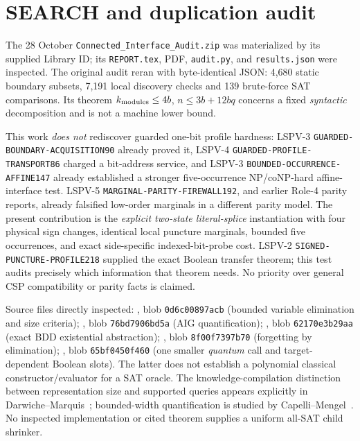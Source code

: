 \documentclass[11pt]{article}
\begin{document}
\section{SEARCH and duplication audit}
The 28 October \texttt{Connected\_Interface\_Audit.zip} was materialized by its supplied Library ID; its \texttt{REPORT.tex}, PDF, \texttt{audit.py}, and \texttt{results.json} were inspected. The original audit reran with byte-identical JSON: 4,680 static boundary subsets, 7,191 local discovery checks and 139 brute-force SAT comparisons. Its theorem $k_{\rm modules}\le4b$, $n\le3b+12bq$ concerns a fixed \emph{syntactic} decomposition and is not a machine lower bound.

This work \emph{does not} rediscover guarded one-bit profile hardness: LSPV-3 \texttt{GUARDED-BOUNDARY-ACQUISITION90} already proved it, LSPV-4 \texttt{GUARDED-PROFILE-TRANSPORT86} charged a bit-address service, and LSPV-3 \texttt{BOUNDED-OCCURRENCE-AFFINE147} already established a stronger five-occurrence NP/coNP-hard affine-interface test. LSPV-5 \texttt{MARGINAL-PARITY-FIREWALL192}, and earlier Role-4 parity reports, already falsified low-order marginals in a different parity model. The present contribution is the \emph{explicit two-state literal-splice} instantiation with four physical sign changes, identical local puncture marginals, bounded five occurrences, and exact side-specific indexed-bit-probe cost. LSPV-2 \texttt{SIGNED-PUNCTURE-PROFILE218} supplied the exact Boolean transfer theorem; this test audits precisely which information that theorem needs. No priority over general CSP compatibility or parity facts is claimed.

Source files directly inspected: , blob \texttt{0d6c00897acb} (bounded variable elimination and size criteria); , blob \texttt{76bd7906bd5a} (AIG quantification); , blob \texttt{62170e3b29aa} (exact BDD existential abstraction); , blob \texttt{8f00f7397b70} (forgetting by elimination); , blob \texttt{65bf0450f460} (one smaller \emph{quantum} call and target-dependent Boolean slots). The latter does not establish a polynomial classical constructor/evaluator for a SAT oracle. The knowledge-compilation distinction between representation size and supported queries appears explicitly in Darwiche--Marquis~\cite{dm}; bounded-width quantification is studied by Capelli--Mengel~\cite{cm}. No inspected implementation or cited theorem supplies a uniform all-SAT child shrinker.
\end{document}
